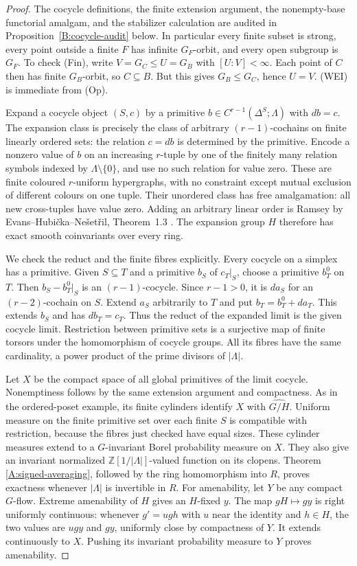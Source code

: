 \begin{proof}
The cocycle definitions, the finite extension argument, the
nonempty-base functorial amalgam, and the stabilizer calculation
are audited in Proposition~\ref{B:cocycle-audit} below. In
particular every finite subset is strong, every point outside
a finite $F$ has infinite $G_F$-orbit, and every open subgroup is
$G_F$. To check (Fin), write $V=G_C\leq U=G_B$ with $[U:V]<\infty$.
Each point of $C$ then has finite $G_B$-orbit, so $C\subseteq B$.
But this gives $G_B\leq G_C$, hence $U=V$. (WEI) is immediate
from (Op).

Expand a cocycle object $(S,c)$ by a primitive
$b\in C^{r-1}(\Delta^S;\Lambda)$ with $db=c$. The expansion class
is precisely the class of arbitrary $(r-1)$-cochains on finite
linearly ordered sets: the relation $c=db$ is determined by the
primitive. Encode a nonzero value of $b$ on an increasing
$r$-tuple by one of the finitely many relation symbols indexed by
$\Lambda\setminus\{0\}$, and use no such relation for value zero.
These are finite coloured $r$-uniform hypergraphs, with no
constraint except mutual exclusion of different colours on one
tuple. Their unordered class has free amalgamation: all new
cross-tuples have value zero. Adding an arbitrary linear order is
Ramsey by Evans--Hubi\v cka--Ne\v set\v ril, Theorem~1.3
\cite{ABEHNFunctions}. The expansion group $H$ therefore has exact
smooth coinvariants over every ring.

We check the reduct and the finite fibres explicitly. Every
cocycle on a simplex has a primitive. Given $S\subseteq T$ and a
primitive $b_S$ of $c_T|_S$, choose a primitive $b_T^0$ on $T$.
Then $b_S-b_T^0|_S$ is an $(r-1)$-cocycle. Since $r-1>0$, it is
$da_S$ for an $(r-2)$-cochain on $S$. Extend $a_S$ arbitrarily to
$T$ and put $b_T=b_T^0+da_T$. This extends $b_S$ and has
$db_T=c_T$. Thus the reduct of the expanded limit is the given
cocycle limit. Restriction between primitive sets is a surjective
map of finite torsors under the homomorphism of cocycle groups.
All its fibres have the same cardinality, a power product of the
prime divisors of $|\Lambda|$.

Let $X$ be the compact space of all global primitives of the limit
cocycle. Nonemptiness follows by the same extension argument and
compactness. As in the ordered-poset example, its finite cylinders
identify $X$ with $\widehat{G/H}$. Uniform measure on the finite
primitive set over each finite $S$ is compatible with restriction,
because the fibres just checked have equal sizes. These cylinder
measures extend to a $G$-invariant Borel probability measure on
$X$. They also give an invariant normalized
$\mathbb Z[1/|\Lambda|]$-valued function on its clopens. Theorem
\ref{A:signed-averaging}, followed by the ring homomorphism into
$R$, proves exactness whenever $|\Lambda|$ is invertible in $R$.
For amenability, let $Y$ be any compact $G$-flow. Extreme
amenability of $H$ gives an $H$-fixed $y$. The map
$gH\mapsto gy$ is right uniformly continuous: whenever $g'=ug h$
with $u$ near the identity and $h\in H$, the two values are $ugy$
and $gy$, uniformly close by compactness of $Y$. It extends
continuously to $X$. Pushing its invariant probability measure
to $Y$ proves amenability.


\end{proof}
